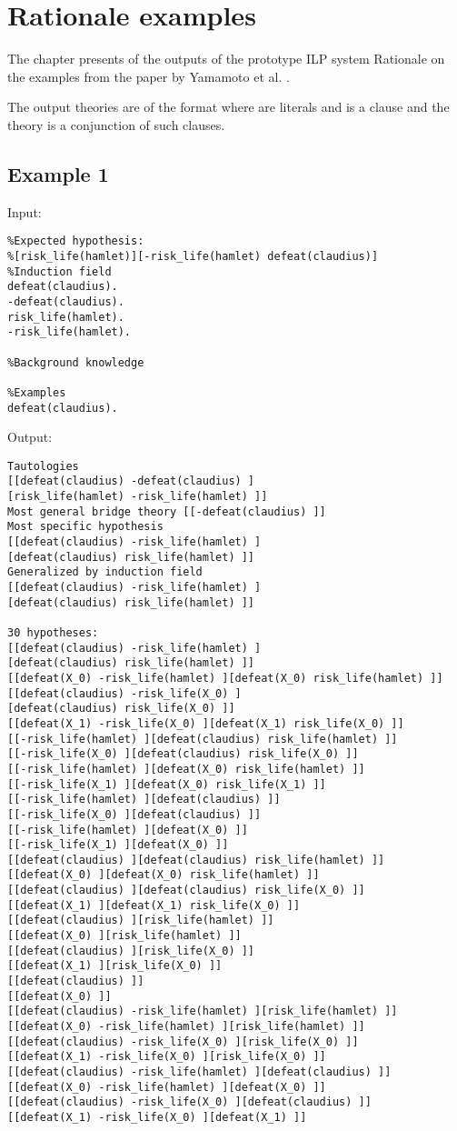 \chapter{Rationale examples}\label{appendix_rationale_examples}
The chapter presents of the outputs of the prototype ILP system Rationale on the examples from the paper by Yamamoto et al. \cite{yamamoto2012inverse}.

The output theories are of the format \tc{[[L11...L1n]...[Lm1...L1k]]}
where  are literals and \tc{[L11...L1n]} is a clause and the theory is a conjunction of such clauses.

\section{Example 1}
Input:
\begin{lstlisting}
%Expected hypothesis:
%[risk_life(hamlet)][-risk_life(hamlet) defeat(claudius)]
%Induction field
defeat(claudius).
-defeat(claudius).
risk_life(hamlet).
-risk_life(hamlet).

%Background knowledge

%Examples
defeat(claudius).
\end{lstlisting}

Output:
\begin{lstlisting}
Tautologies
[[defeat(claudius) -defeat(claudius) ]
[risk_life(hamlet) -risk_life(hamlet) ]]
Most general bridge theory [[-defeat(claudius) ]]
Most specific hypothesis
[[defeat(claudius) -risk_life(hamlet) ]
[defeat(claudius) risk_life(hamlet) ]]
Generalized by induction field
[[defeat(claudius) -risk_life(hamlet) ]
[defeat(claudius) risk_life(hamlet) ]]

30 hypotheses:
[[defeat(claudius) -risk_life(hamlet) ]
[defeat(claudius) risk_life(hamlet) ]]
[[defeat(X_0) -risk_life(hamlet) ][defeat(X_0) risk_life(hamlet) ]]
[[defeat(claudius) -risk_life(X_0) ]
[defeat(claudius) risk_life(X_0) ]]
[[defeat(X_1) -risk_life(X_0) ][defeat(X_1) risk_life(X_0) ]]
[[-risk_life(hamlet) ][defeat(claudius) risk_life(hamlet) ]]
[[-risk_life(X_0) ][defeat(claudius) risk_life(X_0) ]]
[[-risk_life(hamlet) ][defeat(X_0) risk_life(hamlet) ]]
[[-risk_life(X_1) ][defeat(X_0) risk_life(X_1) ]]
[[-risk_life(hamlet) ][defeat(claudius) ]]
[[-risk_life(X_0) ][defeat(claudius) ]]
[[-risk_life(hamlet) ][defeat(X_0) ]]
[[-risk_life(X_1) ][defeat(X_0) ]]
[[defeat(claudius) ][defeat(claudius) risk_life(hamlet) ]]
[[defeat(X_0) ][defeat(X_0) risk_life(hamlet) ]]
[[defeat(claudius) ][defeat(claudius) risk_life(X_0) ]]
[[defeat(X_1) ][defeat(X_1) risk_life(X_0) ]]
[[defeat(claudius) ][risk_life(hamlet) ]]
[[defeat(X_0) ][risk_life(hamlet) ]]
[[defeat(claudius) ][risk_life(X_0) ]]
[[defeat(X_1) ][risk_life(X_0) ]]
[[defeat(claudius) ]]
[[defeat(X_0) ]]
[[defeat(claudius) -risk_life(hamlet) ][risk_life(hamlet) ]]
[[defeat(X_0) -risk_life(hamlet) ][risk_life(hamlet) ]]
[[defeat(claudius) -risk_life(X_0) ][risk_life(X_0) ]]
[[defeat(X_1) -risk_life(X_0) ][risk_life(X_0) ]]
[[defeat(claudius) -risk_life(hamlet) ][defeat(claudius) ]]
[[defeat(X_0) -risk_life(hamlet) ][defeat(X_0) ]]
[[defeat(claudius) -risk_life(X_0) ][defeat(claudius) ]]
[[defeat(X_1) -risk_life(X_0) ][defeat(X_1) ]]
\end{lstlisting}

